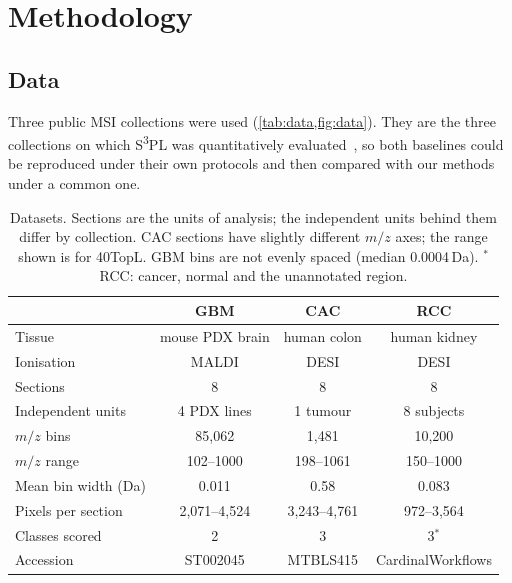 \section{Methodology}
\label{sec:methodology}

\subsection{Data}
\label{sec:data}
Three public MSI collections were used (\cref{tab:data,fig:data}). They are the three
collections on which S\textsuperscript{3}PL was quantitatively
evaluated~\citep{weigand2026spatial}, so both baselines could be reproduced
under their own protocols and then compared with our methods under a common
one.

\begin{table}[t]
\caption{Datasets. Sections are the units of analysis; the independent units
behind them differ by collection. CAC sections have slightly different $m/z$
axes; the range shown is for 40TopL. GBM bins are not evenly spaced (median
0.0004\,Da). $^{*}$RCC: cancer, normal and the unannotated region.}
\label{tab:data}
\centering\footnotesize
\setlength{\tabcolsep}{3pt}
\begin{tabular}{@{}lccc@{}}
\toprule
 & GBM & CAC & RCC \\
\midrule
Tissue & mouse PDX brain & human colon & human kidney \\
Ionisation & MALDI & DESI & DESI \\
Sections & 8 & 8 & 8 \\
Independent units & 4 PDX lines & 1 tumour & 8 subjects \\
$m/z$ bins & 85{,}062 & 1{,}481 & 10{,}200 \\
$m/z$ range & 102--1000 & 198--1061 & 150--1000 \\
Mean bin width (Da) & 0.011 & 0.58 & 0.083 \\
Pixels per section & 2{,}071--4{,}524 & 3{,}243--4{,}761 & 972--3{,}564 \\
Classes scored & 2 & 3 & 3$^{*}$ \\
Accession & ST002045 & MTBLS415 & Cardinal\-Workflows \\
\bottomrule
\end{tabular}
\end{table}

